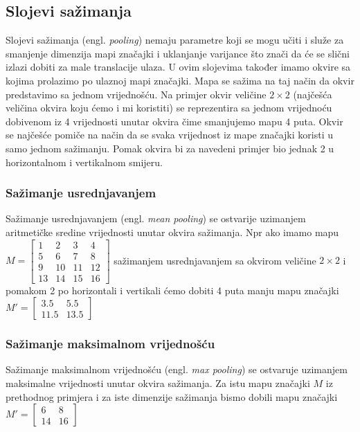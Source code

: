 \documentclass[times, utf8, zavrsni]{fer}
\begin{document}
\subsection{Slojevi sažimanja}\label{Slojevi sažimanja}
Slojevi sažimanja (engl. \textit{pooling}) nemaju parametre koji se mogu učiti i služe za smanjenje dimenzija mapi značajki i uklanjanje varijance što znači da će se slični izlazi dobiti za male translacije ulaza. U ovim slojevima također imamo okvire sa kojima prolazimo po ulaznoj mapi značajki. Mapa se sažima na taj način da okvir predstavimo sa jednom vrijednošću. Na primjer okvir veličine $2 \times 2$ (najčešća veličina okvira koju ćemo i mi koristiti) se reprezentira sa jednom vrijednoću dobivenom iz 4 vrijednosti unutar okvira čime smanjujemo mapu 4 puta. Okvir se najčešće pomiče na način da se svaka vrijednost iz mape značajki koristi u samo jednom sažimanju. Pomak okvira bi za navedeni primjer bio jednak 2 u horizontalnom i vertikalnom smijeru.
\subsubsection{Sažimanje usrednjavanjem}
Sažimanje usrednjavanjem (engl. \textit{mean pooling}) se ostvarije uzimanjem aritmetičke sredine vrijednosti unutar okvira sažimanja. Npr ako imamo mapu $M = \left[
\begin{matrix}
1 & 2 & 3 & 4 \\
5 & 6 & 7 & 8 \\ 
9 & 10 & 11 & 12 \\
13 & 14 & 15 & 16
\end{matrix} \right]
$
sažimanjem usrednjavanjem sa okvirom veličine $2 \times 2$ i pomakom 2 po horizontali i vertikali ćemo dobiti 4 puta manju mapu značajki $M' = \left[
\begin{matrix}
3.5 & 5.5 \\
11.5 & 13.5
\end{matrix} \right]
$

\subsubsection{Sažimanje maksimalnom vrijednošću}
Sažimanje maksimalnom vrijednošću (engl. \textit{max pooling}) se ostvaruje uzimanjem maksimalne vrijednosti unutar okvira sažimanja. Za istu mapu značajki $M$ iz prethodnog primjera i za iste dimenzije sažimanja bismo dobili mapu značajki $M' = \left[
\begin{matrix}
6 & 8 \\
14 & 16
\end{matrix} \right]
$
\end{document}
